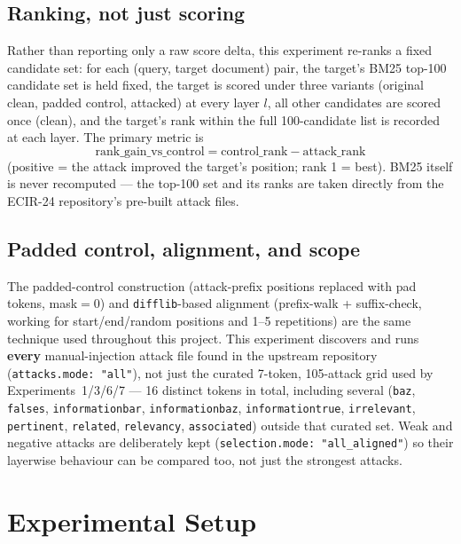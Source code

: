 \documentclass[11pt]{article}
\begin{document}
\subsection{Ranking, not just scoring}

Rather than reporting only a raw score delta, this experiment re-ranks a
fixed candidate set: for each (query, target document) pair, the target's
BM25 top-100 candidate set is held fixed, the target is scored under three
variants (original clean, padded control, attacked) at every layer $l$, all
other candidates are scored once (clean), and the target's rank within the
full 100-candidate list is recorded at each layer. The primary metric is
\[
\text{rank\_gain\_vs\_control} = \text{control\_rank} - \text{attack\_rank}
\]
(positive = the attack improved the target's position; rank 1 = best).
BM25 itself is never recomputed — the top-100 set and its ranks are taken
directly from the ECIR-24 repository's pre-built attack files.

\subsection{Padded control, alignment, and scope}

The padded-control construction (attack-prefix positions replaced with
pad tokens, mask$=0$) and \texttt{difflib}-based alignment (prefix-walk +
suffix-check, working for start/end/random positions and 1--5 repetitions)
are the same technique used throughout this project. This experiment
discovers and runs \textbf{every} manual-injection attack file found in the
upstream repository (\texttt{attacks.mode: "all"}), not just the curated
7-token, 105-attack grid used by Experiments~1/3/6/7 — 16 distinct tokens
in total, including several (\texttt{baz}, \texttt{falses},
\texttt{informationbar}, \texttt{informationbaz}, \texttt{informationtrue},
\texttt{irrelevant}, \texttt{pertinent}, \texttt{related},
\texttt{relevancy}, \texttt{associated}) outside that curated set. Weak and
negative attacks are deliberately kept (\texttt{selection.mode:
"all\_aligned"}) so their layerwise behaviour can be compared too, not just
the strongest attacks.

\section{Experimental Setup}
\end{document}
